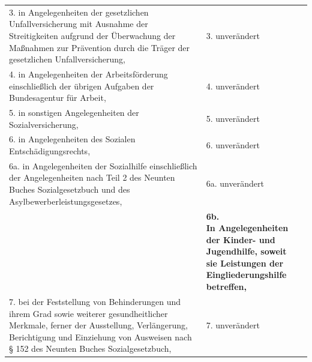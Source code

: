 \documentclass[10pt,a4paper,landscape]{article}
\begin{document}
\begin{longtable}{|L{8.2cm}|L{8.2cm}|L{8.2cm}|}
\hhline{|---|}
3.  \newline in Angelegenheiten der gesetzlichen  \newline Unfallversicherung mit Ausnahme der  \newline Streitigkeiten aufgrund der Überwachung  \newline der Maßnahmen zur Prävention durch die  \newline Träger der gesetzlichen  \newline Unfallversicherung, & 3. unverändert &  \\
\hhline{|---|}
4.  \newline in Angelegenheiten der Arbeitsförderung  \newline einschließlich der übrigen Aufgaben der  \newline Bundesagentur für Arbeit, & 4. unverändert &  \\
\hhline{|---|}
5.  \newline in sonstigen Angelegenheiten der  \newline Sozialversicherung, & 5. unverändert &  \\
\hhline{|---|}
6.  \newline in Angelegenheiten des Sozialen  \newline Entschädigungsrechts, & 6. unverändert &  \\
\hhline{|---|}
6a.  \newline in Angelegenheiten der Sozialhilfe  \newline einschließlich der Angelegenheiten nach  \newline Teil 2 des Neunten Buches  \newline Sozialgesetzbuch und des  \newline Asylbewerberleistungsgesetzes, & 6a. unverändert &  \\
\hhline{|---|}
 & \textbf{\textcolor{diffred}{6b.  \newline In Angelegenheiten der Kinder- und  \newline Jugendhilfe, soweit sie Leistungen der  \newline Eingliederungshilfe betreffen, }} &  \\
\hhline{|---|}
7.  \newline bei der Feststellung von Behinderungen  \newline und ihrem Grad sowie weiterer  \newline gesundheitlicher Merkmale, ferner der  \newline Ausstellung, Verlängerung, Berichtigung  \newline und Einziehung von Ausweisen nach \S{} 152  \newline des Neunten Buches Sozialgesetzbuch, & 7. unverändert &  \\

\end{longtable}
\end{document}
